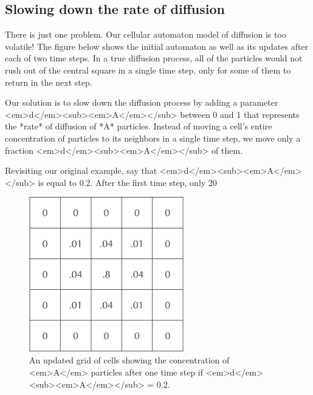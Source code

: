 {\FloatBarrier
{}
\subsection{Slowing down the rate of diffusion}

There is just one problem. Our cellular automaton model of diffusion is too volatile! The figure below shows the initial automaton as well as its updates after each of two time steps. In a true diffusion process, all of the particles would not rush out of the central square in a single time step, only for some of them to return in the next step.

{%

Our solution is to slow down the diffusion process by adding a parameter <em>d</em><sub><em>A</em></sub> between 0 and 1 that represents the *rate* of diffusion of *A* particles. Instead of moving a cell's entire concentration of particles to its neighbors in a single time step, we move only a fraction <em>d</em><sub><em>A</em></sub> of them.

Revisiting our original example, say that <em>d</em><sub><em>A</em></sub> is equal to 0.2. After the first time step, only 20%

\begin{figure}[h]
\centering
\mySfFamily
\includegraphics[width = 0.6\textwidth]{../assets/images/600px/A_concentration_slower_diffusion.png}
\caption{An updated grid of cells showing the concentration of <em>A</em> particles after one time step if <em>d</em><sub><em>A</em></sub> = 0.2.}
\label{fig:A_concentration_slower_diffusion}
\end{figure}

}}

